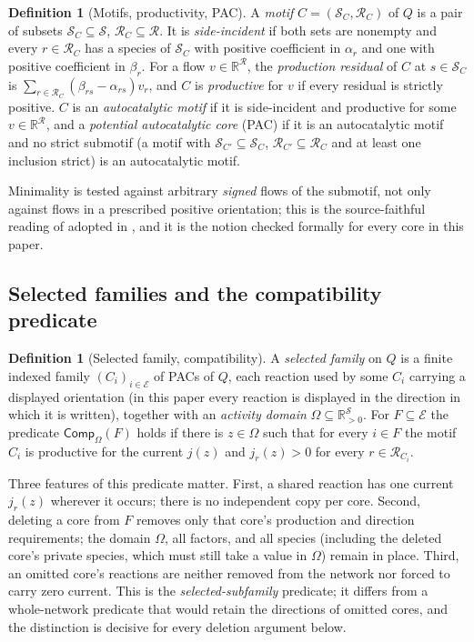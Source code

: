 \documentclass[11pt,a4paper]{article}
\theoremstyle{plain}
\theoremstyle{definition}
\newtheorem{definition}[theorem]{Definition}
\theoremstyle{remark}
\newcommand{\R}{\mathbb{R}}
\newcommand{\Rpos}{\R_{>0}}
\newcommand{\cS}{\mathcal{S}}
\newcommand{\cR}{\mathcal{R}}
\newcommand{\cE}{\mathcal{E}}
\newcommand{\Comp}{\mathsf{Comp}}
\begin{document}
\begin{definition}[Motifs, productivity, PAC]\label{def:motif}
A \emph{motif} $C=(\cS_C,\cR_C)$ of $Q$ is a pair of subsets $\cS_C\subseteq\cS$, $\cR_C\subseteq\cR$. It is \emph{side-incident} if both sets are nonempty and every $r\in\cR_C$ has a species of $\cS_C$ with positive coefficient in $\alpha_r$ and one with positive coefficient in $\beta_r$. For a flow $v\in\R^{\cR}$, the \emph{production residual} of $C$ at $s\in\cS_C$ is $\sum_{r\in\cR_C}(\beta_{rs}-\alpha_{rs})v_r$, and $C$ is \emph{productive} for $v$ if every residual is strictly positive. $C$ is an \emph{autocatalytic motif} if it is side-incident and productive for some $v\in\R^{\cR}$, and a \emph{potential autocatalytic core} (PAC) if it is an autocatalytic motif and no strict submotif (a motif with $\cS_{C'}\subseteq\cS_C$, $\cR_{C'}\subseteq\cR_C$ and at least one inclusion strict) is an autocatalytic motif.
\end{definition}

Minimality is tested against arbitrary \emph{signed} flows of the submotif, not only against flows in a prescribed positive orientation; this is the source-faithful reading of \citep{kosc2025} adopted in \citep{tcic2026}, and it is the notion checked formally for every core in this paper.

\subsection{Selected families and the compatibility predicate}

\begin{definition}[Selected family, compatibility]\label{def:family}
A \emph{selected family} on $Q$ is a finite indexed family $(C_i)_{i\in\cE}$ of PACs of $Q$, each reaction used by some $C_i$ carrying a displayed orientation (in this paper every reaction is displayed in the direction in which it is written), together with an \emph{activity domain} $\Omega\subseteq\Rpos^{\cS}$. For $F\subseteq\cE$ the predicate $\Comp_\Omega(F)$ holds if there is $z\in\Omega$ such that for every $i\in F$ the motif $C_i$ is productive for the current $j(z)$ and $j_r(z)>0$ for every $r\in\cR_{C_i}$.
\end{definition}

Three features of this predicate matter. First, a shared reaction has one current $j_r(z)$ wherever it occurs; there is no independent copy per core. Second, deleting a core from $F$ removes only that core's production and direction requirements; the domain $\Omega$, all factors, and all species (including the deleted core's private species, which must still take a value in $\Omega$) remain in place. Third, an omitted core's reactions are neither removed from the network nor forced to carry zero current. This is the \emph{selected-subfamily} predicate; it differs from a whole-network predicate that would retain the directions of omitted cores, and the distinction is decisive for every deletion argument below.
\end{document}
